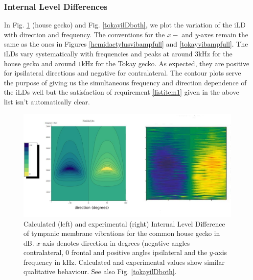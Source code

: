 \subsubsection{Internal Level Differences}
In Fig. \ref{hemidactylusilDboth} (house gecko) and Fig. \ref{tokayilDboth}, we plot the
variation of the iLD with direction and frequency. The conventions for the $x-$ and $y$-axes remain the same as the ones in Figures \ref{hemidactylusvibampfull}
and \ref{tokayvibampfull}. The iLDs vary systematically with frequencies and peaks at around $3$kHz for the house gecko and around $1$kHz for the Tokay gecko.
As expected, they are positive for ipsilateral directions and negative for contralateral. The contour plots serve the purpose of giving us the simultaneous frequency and direction dependence of the iLDs well but the 
satisfaction of requirement \ref{listitem1} given in the above list isn't automatically clear.
\begin{figure}[ht!]
 \centering
 \includegraphics[width=1.0\linewidth]{Diagrams/Plots/iLD/hemidactylusiLDboth.png}
 \caption[ILD plots for the common house gecko]{Calculated (left) and experimental (right) Internal Level Difference of tympanic membrane vibrations for the common house gecko
 in dB. $x$-axis denotes direction in degrees (negative angles contralateral, 0 frontal and positive angles ipsilateral and the $y$-axis frequency in kHz. 
 Calculated and experimental values \cite{dalsgaardmanley2} show similar qualitative behaviour. See also Fig. \ref{tokayilDboth}.}
  \label{hemidactylusilDboth}
\end{figure}


